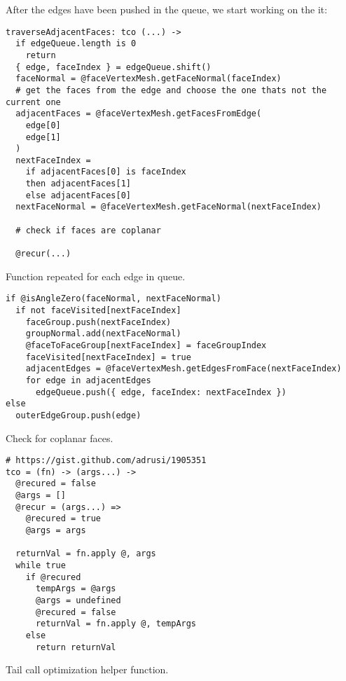 \documentclass[../ClassicThesis.tex]{subfiles}
\begin{document}
After the edges have been pushed in the queue, we start working on the it:

\begin{listing}[ht]
\begin{verbatim}
traverseAdjacentFaces: tco (...) ->
  if edgeQueue.length is 0
    return
  { edge, faceIndex } = edgeQueue.shift()
  faceNormal = @faceVertexMesh.getFaceNormal(faceIndex)
  # get the faces from the edge and choose the one thats not the current one
  adjacentFaces = @faceVertexMesh.getFacesFromEdge(
    edge[0]
    edge[1]
  )
  nextFaceIndex =
    if adjacentFaces[0] is faceIndex
    then adjacentFaces[1]
    else adjacentFaces[0]
  nextFaceNormal = @faceVertexMesh.getFaceNormal(nextFaceIndex)
 
  # check if faces are coplanar

  @recur(...)
\end{verbatim}
\caption{Function repeated for each edge in queue.}
\label{lst:coffeescript}
\end{listing}

\begin{listing}[ht]
\begin{verbatim}
if @isAngleZero(faceNormal, nextFaceNormal)
  if not faceVisited[nextFaceIndex]
    faceGroup.push(nextFaceIndex)
    groupNormal.add(nextFaceNormal)
    @faceToFaceGroup[nextFaceIndex] = faceGroupIndex
    faceVisited[nextFaceIndex] = true
    adjacentEdges = @faceVertexMesh.getEdgesFromFace(nextFaceIndex)
    for edge in adjacentEdges
      edgeQueue.push({ edge, faceIndex: nextFaceIndex })
else
  outerEdgeGroup.push(edge)
\end{verbatim}
\caption{Check for coplanar faces.}
\label{lst:coffeescript}
\end{listing}

\begin{listing}[ht]
\begin{verbatim}
# https://gist.github.com/adrusi/1905351
tco = (fn) -> (args...) ->
  @recured = false
  @args = []
  @recur = (args...) =>
    @recured = true
    @args = args

  returnVal = fn.apply @, args
  while true
    if @recured
      tempArgs = @args
      @args = undefined
      @recured = false
      returnVal = fn.apply @, tempArgs
    else
      return returnVal
\end{verbatim}
\caption{Tail call optimization helper function.}
\label{lst:coffeescript}
\end{listing}
\end{document}
